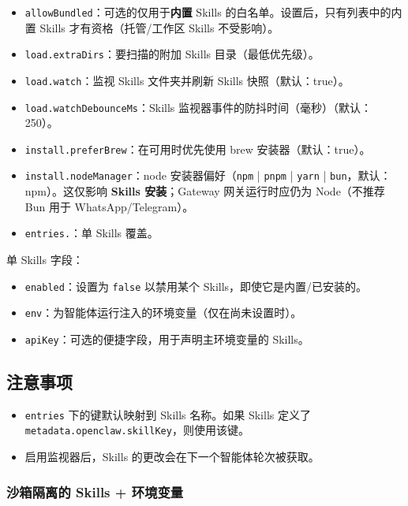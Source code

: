 \begin{itemize}
  \item \texttt{allowBundled}：可选的仅用于\textbf{内置} Skills 的白名单。设置后，只有列表中的内置 Skills 才有资格（托管/工作区 Skills 不受影响）。
  \item \texttt{load.extraDirs}：要扫描的附加 Skills 目录（最低优先级）。
  \item \texttt{load.watch}：监视 Skills 文件夹并刷新 Skills 快照（默认：true）。
  \item \texttt{load.watchDebounceMs}：Skills 监视器事件的防抖时间（毫秒）（默认：250）。
  \item \texttt{install.preferBrew}：在可用时优先使用 brew 安装器（默认：true）。
  \item \texttt{install.nodeManager}：node 安装器偏好（\texttt{npm} | \texttt{pnpm} | \texttt{yarn} | \texttt{bun}，默认：npm）。这仅影响 \textbf{Skills 安装}；Gateway 网关运行时应仍为 Node（不推荐 Bun 用于 WhatsApp/Telegram）。
  \item \texttt{entries.}：单 Skills 覆盖。
\end{itemize}


单 Skills 字段：

\begin{itemize}
  \item \texttt{enabled}：设置为 \texttt{false} 以禁用某个 Skills，即使它是内置/已安装的。
  \item \texttt{env}：为智能体运行注入的环境变量（仅在尚未设置时）。
  \item \texttt{apiKey}：可选的便捷字段，用于声明主环境变量的 Skills。
\end{itemize}


\subsection{注意事项}


\begin{itemize}
  \item \texttt{entries} 下的键默认映射到 Skills 名称。如果 Skills 定义了 \texttt{metadata.openclaw.skillKey}，则使用该键。
  \item 启用监视器后，Skills 的更改会在下一个智能体轮次被获取。
\end{itemize}


\subsubsection{沙箱隔离的 Skills + 环境变量}


